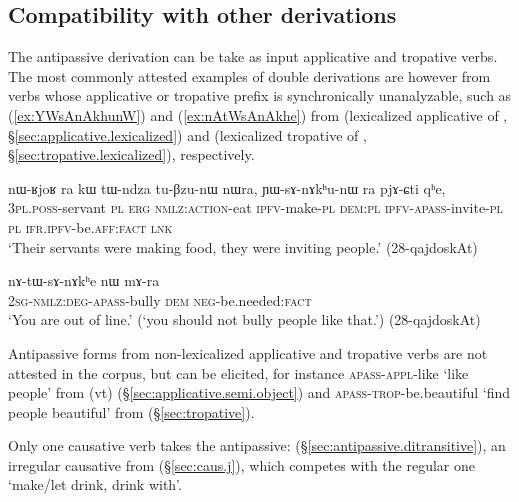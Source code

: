  \subsection{Compatibility with other derivations} \label{sec:antipassive.compatibility}
 The  antipassive derivation can be take as input applicative and tropative verbs. The most commonly attested examples of double derivations are however from verbs whose applicative or tropative prefix is synchronically unanalyzable, such as    (\ref{ex:YWsAnAkhunW}) and   (\ref{ex:nAtWsAnAkhe}) from   (lexicalized applicative of , §\ref{sec:applicative.lexicalized}) and  (lexicalized  tropative of , §\ref{sec:tropative.lexicalized}), respectively.
 \largerpage
\begin{exe}
\ex \label{ex:YWsAnAkhunW}
\gll  nɯ-ʁjoʁ ra kɯ tɯ-ndza tu-βzu-nɯ nɯra, ɲɯ-sɤ-nɤkʰu-nɯ ra pjɤ-ɕti qʰe,  \\
\textsc{3pl}.\textsc{poss}-servant \textsc{pl} \textsc{erg} \textsc{nmlz}:\textsc{action}-eat \textsc{ipfv}-make-\textsc{pl} \textsc{dem}:\textsc{pl} \textsc{ipfv}-\textsc{apass}-invite-\textsc{pl} \textsc{pl} \textsc{ifr}.\textsc{ipfv}-be.\textsc{aff}:\textsc{fact} \textsc{lnk} \\
\glt `Their servants were making food, they were inviting people.' (28-qajdoskAt) 	
  \end{exe}
  
 \begin{exe}
\ex \label{ex:nAtWsAnAkhe}
\gll  nɤ-tɯ-sɤ-nɤkʰe nɯ mɤ-ra \\
\textsc{2sg}-\textsc{nmlz}:\textsc{deg}-\textsc{apass}-bully \textsc{dem} \textsc{neg}-be.needed:\textsc{fact} \\
\glt `You are out of line.' (`you should not bully people like that.') (28-qajdoskAt) 
 \end{exe}
 
Antipassive forms from non-lexicalized applicative and tropative verbs are not attested in the corpus, but can be elicited, for instance  \textsc{apass}-\textsc{appl}-like `like people' from   (vt) (§\ref{sec:applicative.semi.object}) and  \textsc{apass}-\textsc{trop}-be.beautiful `find people beautiful' from   (§\ref{sec:tropative}).

Only one causative verb takes the  antipassive:   (§\ref{sec:antipassive.ditransitive}), an irregular causative from  (§\ref{sec:caus.j}), which competes with the regular one  `make/let drink, drink with'.

